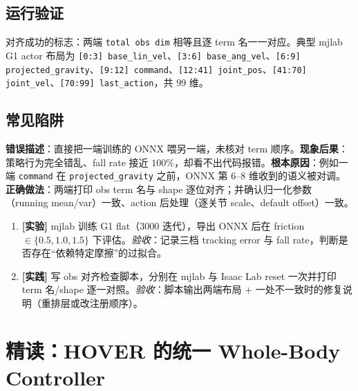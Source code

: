 \subsection{运行验证}
对齐成功的标志：两端 \texttt{total obs dim} 相等且逐 term 名一一对应。典型 mjlab G1 actor 布局为 \texttt{[0:3] base\_lin\_vel}、\texttt{[3:6] base\_ang\_vel}、\texttt{[6:9] projected\_gravity}、\texttt{[9:12] command}、\texttt{[12:41] joint\_pos}、\texttt{[41:70] joint\_vel}、\texttt{[70:99] last\_action}，共 $99$ 维。

\subsection{常见陷阱}
\begin{pitfall}
\textbf{错误描述}：直接把一端训练的 ONNX 喂另一端，未核对 term 顺序。\textbf{现象后果}：策略行为完全错乱、fall rate 接近 $100\%$，却看不出代码报错。\textbf{根本原因}：例如一端 \texttt{command} 在 \texttt{projected\_gravity} 之前，ONNX 第 $6$--$8$ 维收到的语义被对调。\textbf{正确做法}：两端打印 obs term 名与 shape 逐位对齐；并确认归一化参数（running mean/var）一致、action 后处理（逐关节 scale、default offset）一致。
\end{pitfall}

\begin{practice}[本节动手]
\begin{enumerate}
  \item \textbf{[实验]} mjlab 训练 G1 flat（$3000$ 迭代），导出 ONNX 后在 friction $\in\{0.5,1.0,1.5\}$ 下评估。\emph{验收}：记录三档 tracking error 与 fall rate，判断是否存在“依赖特定摩擦”的过拟合。
  \item \textbf{[实践]} 写 obs 对齐检查脚本，分别在 mjlab 与 Isaac Lab reset 一次并打印 term 名/shape 逐一对照。\emph{验收}：脚本输出两端布局 $+$ 一处不一致时的修复说明（重排层或改注册顺序）。
\end{enumerate}
\end{practice}

\section{精读：HOVER 的统一 Whole-Body Controller}\label{sec:rlmc-hl-hover}

